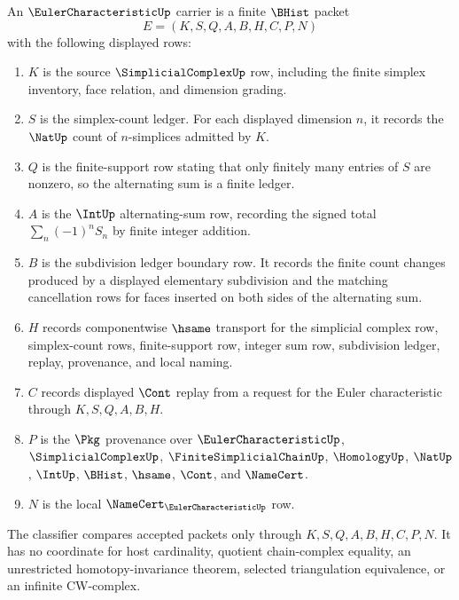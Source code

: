 \begin{definition}
\label{def:euler-characteristic-finite-complex-carrier}
An $\EulerCharacteristicUp$ carrier is a finite $\BHist$ packet
$$
E=(K,S,Q,A,B,H,C,P,N)
$$
with the following displayed rows:
\begin{enumerate}
\item $K$ is the source $\SimplicialComplexUp$ row, including the finite simplex inventory, face relation, and dimension grading.
\item $S$ is the simplex-count ledger. For each displayed dimension $n$, it records the $\NatUp$ count of $n$-simplices admitted by $K$.
\item $Q$ is the finite-support row stating that only finitely many entries of $S$ are nonzero, so the alternating sum is a finite ledger.
\item $A$ is the $\IntUp$ alternating-sum row, recording the signed total $\sum_n (-1)^n S_n$ by finite integer addition.
\item $B$ is the subdivision ledger boundary row. It records the finite count changes produced by a displayed elementary subdivision and the matching cancellation rows for faces inserted on both sides of the alternating sum.
\item $H$ records componentwise $\hsame$ transport for the simplicial complex row, simplex-count rows, finite-support row, integer sum row, subdivision ledger, replay, provenance, and local naming.
\item $C$ records displayed $\Cont$ replay from a request for the Euler characteristic through $K,S,Q,A,B,H$.
\item $P$ is the $\Pkg$ provenance over $\EulerCharacteristicUp$, $\SimplicialComplexUp$, $\FiniteSimplicialChainUp$, $\HomologyUp$, $\NatUp$, $\IntUp$, $\BHist$, $\hsame$, $\Cont$, and $\NameCert$.
\item $N$ is the local $\NameCert_{\EulerCharacteristicUp}$ row.
\end{enumerate}
The classifier compares accepted packets only through $K,S,Q,A,B,H,C,P,N$. It has no coordinate for host cardinality, quotient chain-complex equality, an unrestricted homotopy-invariance theorem, selected triangulation equivalence, or an infinite CW-complex.
\end{definition}

